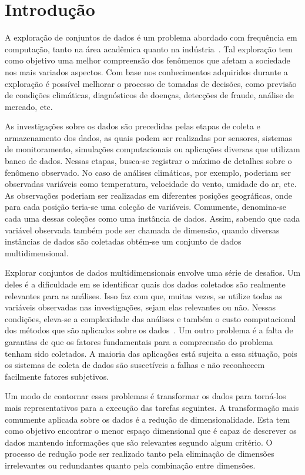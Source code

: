 \section{Introdução}

A exploração de conjuntos de dados é um problema abordado
com frequência em computação, tanto na área acadêmica quanto
na indústria~\cite{Ngai2009,Harding2006}. Tal exploração tem
como objetivo uma melhor compreensão dos fenômenos que
afetam a sociedade nos mais variados aspectos. Com base nos
conhecimentos adquiridos durante a exploração é possível 
melhorar o processo de tomadas de decisões, como
previsão de condições climáticas, diagnósticos de doenças,
detecções de fraude, análise de mercado, etc.

As investigações sobre os dados são precedidas pelas etapas
de coleta e armazenamento dos dados, as quais podem ser
realizadas por sensores, sistemas de monitoramento,
simulações computacionais ou aplicações diversas que
utilizam banco de dados. Nessas etapas, busca-se registrar o
máximo de detalhes sobre o fenômeno observado. No caso de
análises climáticas, por exemplo, poderiam ser observadas
variáveis como temperatura, velocidade do vento, umidade do
ar, etc. As observações poderiam ser realizadas em
diferentes posições geográficas, onde para cada posição
teria-se uma coleção de variáveis. Comumente, denomina-se
cada uma dessas coleções como uma instância de dados.
Assim, sabendo que cada variável observada também pode ser
chamada de dimensão, quando diversas instâncias de dados são
coletadas obtém-se um conjunto de dados multidimensional. 

Explorar conjuntos de dados multidimensionais envolve uma
série de desafios. Um deles é a dificuldade em se
identificar quais dos dados coletados são realmente
relevantes para as análises. Isso faz com que, muitas vezes,
se utilize todas as variáveis observadas nas investigações,
sejam elas relevantes ou não. Nessas condições, eleva-se a
complexidade das análises e também o custo computacional dos
métodos que são aplicados sobre os dados~\cite{Beyer1999}.
Um outro problema é a falta de garantias de que os fatores
fundamentais para a compreensão do problema tenham sido
coletados. A maioria das aplicações está sujeita a essa
situação, pois os sistemas de coleta de dados são
suscetíveis a falhas e não reconhecem facilmente fatores
subjetivos. 

Um modo de contornar esses problemas é transformar os dados
para torná-los mais representativos para a execução das
tarefas seguintes. A transformação mais comumente aplicada
sobre os dados é a redução de dimensionalidade. Esta tem
como objetivo encontrar o menor espaço dimensional que é
capaz de descrever os dados mantendo informações que são
relevantes segundo algum critério. O processo de redução
pode ser realizado tanto pela eliminação de dimensões
irrelevantes ou redundantes quanto pela combinação entre
dimensões. 

